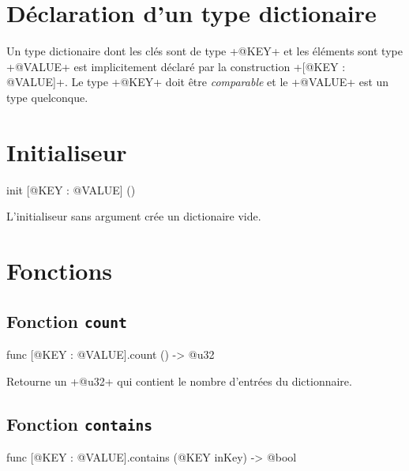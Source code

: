 


\section{Déclaration d'un type dictionaire}

Un type dictionaire dont les clés sont de type \ggsq+@KEY+ et les éléments sont type \ggsq+@VALUE+ est implicitement déclaré par la construction \ggsq+[@KEY : @VALUE]+. Le type \ggsq+@KEY+ doit être \emph{comparable} et le \ggsq+@VALUE+ est un type quelconque.






\section{Initialiseur}

\begin{galgas4}
init [@KEY : @VALUE] ()
\end{galgas4}

L'initialiseur sans argument crée un dictionaire vide.


\section{Fonctions}

\subsection{Fonction \texttt{count}}

\begin{galgas4}
func [@KEY : @VALUE].count () -> @u32
\end{galgas4}


Retourne un \ggsq+@u32+ qui contient le nombre d'entrées du dictionnaire.



\subsection{Fonction \texttt{contains}}

\begin{galgas4}
func [@KEY : @VALUE].contains (@KEY inKey) -> @bool
\end{galgas4}

